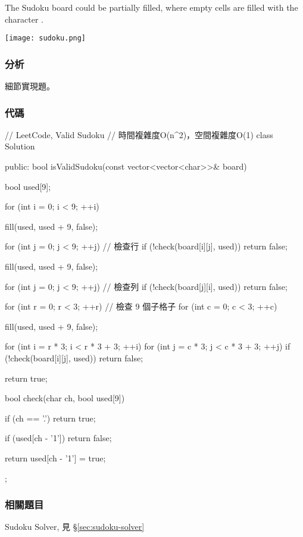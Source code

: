The Sudoku board could be partially filled, where empty cells are filled with the character .

\begin{center}
\texttt{[image: sudoku.png]}\\
\label{fig:sudoku}
\end{center}

\subsubsection{分析}
細節實現題。


\subsubsection{代碼}
\begin{Code}
// LeetCode, Valid Sudoku
// 時間複雜度O(n^2)，空間複雜度O(1)
class Solution {
public:
    bool isValidSudoku(const vector<vector<char>>& board) {
        bool used[9];

        for (int i = 0; i < 9; ++i) {
            fill(used, used + 9, false);

            for (int j = 0; j < 9; ++j) // 檢查行
                if (!check(board[i][j], used))
                    return false;

            fill(used, used + 9, false);

            for (int j = 0; j < 9; ++j) // 檢查列
                if (!check(board[j][i], used))
                    return false;
        }

        for (int r = 0; r < 3; ++r) // 檢查 9 個子格子
            for (int c = 0; c < 3; ++c) {
                fill(used, used + 9, false);

                for (int i = r * 3; i < r * 3 + 3; ++i)
                    for (int j = c * 3; j < c * 3 + 3; ++j)
                        if (!check(board[i][j], used))
                            return false;
            }

        return true;
    }

    bool check(char ch, bool used[9]) {
        if (ch == '.') return true;

        if (used[ch - '1']) return false;

        return used[ch - '1'] = true;
    }
};
\end{Code}


\subsubsection{相關題目}
\begindot
\item Sudoku Solver, 見 \S \ref{sec:sudoku-solver}
\myenddot


